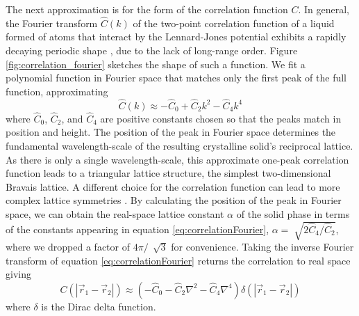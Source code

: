 The next approximation is for the form of the correlation function $C$. In general, the Fourier transform $\hat{C}(k)$ of the two-point correlation function of a liquid formed of atoms that interact by the Lennard-Jones potential exhibits a rapidly decaying periodic shape \cite{mandel70}, due to the lack of long-range order. Figure \ref{fig:correlation_fourier} sketches the shape of such a function. We fit a polynomial function in Fourier space that matches only the first peak of the full function, approximating
\begin{equation}\label{eq:correlationFourier}
\hat{C}(k) \approx -\hat{C}_0+\hat{C}_2 k^2 - \hat{C}_4 k^4
\end{equation}
where $\hat{C}_0$, $\hat{C}_2$, and $\hat{C}_4$ are positive constants chosen so that the peaks match in position and height. The position of the peak in Fourier space determines the fundamental wavelength-scale of the resulting crystalline solid's reciprocal lattice. As there is only a single wavelength-scale, this approximate one-peak correlation function leads to a triangular lattice structure, the simplest two-dimensional Bravais lattice. A different choice for the correlation function can lead to more complex lattice symmetries \cite{greenwood10,greenwood11}. By calculating the position of the peak in Fourier space, we can obtain the real-space lattice constant $\alpha$ of the solid phase in terms of the constants appearing in equation \ref{eq:correlationFourier}, $\alpha = \sqrt[]{{2 \hat{C}_4}/{\hat{C}_2}}$, where we dropped a factor of $4\pi/\,\sqrt[]{3}$ for convenience. Taking the inverse Fourier transform of equation \ref{eq:correlationFourier} returns the correlation to real space giving
\begin{equation}\label{eq:correlationReal}
C(|\vec{r}_1-\vec{r}_2|) \approx (-\hat{C}_0-\hat{C}_2 \nabla^2 - \hat{C}_4 \nabla^4)\delta(|\vec{r}_1-\vec{r}_2|)
\end{equation}
where $\delta$ is the Dirac delta function.

